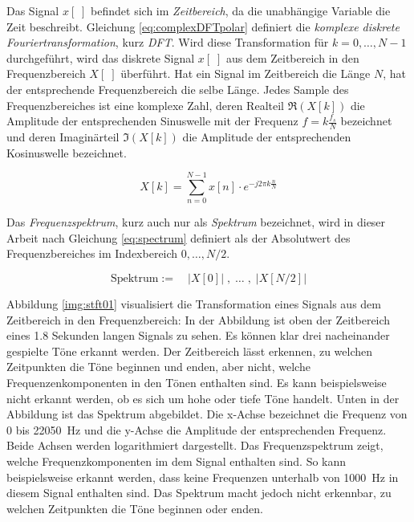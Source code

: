 Das Signal $x[\;]$ befindet sich im \emph{Zeitbereich}, da die unabhängige Variable die Zeit beschreibt. Gleichung \ref{eq:complexDFTpolar} definiert die \emph{komplexe diskrete Fouriertransformation}, kurz \emph{DFT}. Wird diese Transformation für $k = 0 , \ldots , N-1$ durchgeführt, wird das diskrete Signal $x[\;]$ aus dem Zeitbereich in den Frequenzbereich $X[\;]$ überführt. Hat ein Signal im Zeitbereich die Länge $N$, hat der entsprechende Frequenzbereich die selbe Länge. Jedes Sample des Frequenzbereiches ist eine komplexe Zahl, deren Realteil $\Re(X[k])$ die Amplitude der entsprechenden Sinuswelle mit der Frequenz $f = k\frac{f_s}{N}$ bezeichnet und deren Imaginärteil  $\Im(X[k])$ die Amplitude der entsprechenden Kosinuswelle bezeichnet.\cite[S. 149, S. 567 - 571]{dspGuide} \cite[S. 60]{sprachverarbeitung}

\begin{equation}
\label{eq:complexDFTpolar}
X[k] =  \sum_{n = 0}^{N-1}  x[n] \cdot e^{-j 2\pi k \frac{n}{N}}
\end{equation}

Das \emph{Frequenzspektrum}, kurz auch nur als \emph{Spektrum} bezeichnet, wird in dieser Arbeit nach Gleichung \ref{eq:spectrum} definiert als der Absolutwert des Frequenzbereiches im Indexbereich $0, \ldots , N/2$.

\begin{equation}
\label{eq:spectrum}
\text{Spektrum} := \quad |X[0]| \; , \; \ldots \; , \; |X[N/2]|
\end{equation}

Abbildung \ref{img:stft01} visualisiert die Transformation eines Signals aus dem Zeitbereich in den Frequenzbereich: In der Abbildung ist oben der Zeitbereich eines 1.8 Sekunden langen Signals zu sehen. Es können klar drei nacheinander gespielte Töne erkannt werden. Der Zeitbereich lässt erkennen, zu welchen Zeitpunkten die Töne beginnen und enden, aber nicht, welche Frequenzenkomponenten in den Tönen enthalten sind. Es kann beispielsweise nicht erkannt werden, ob es sich um hohe oder tiefe Töne handelt. Unten in der Abbildung ist das Spektrum abgebildet. Die x-Achse bezeichnet die Frequenz von 0 bis \SI{22050}{\hertz} und die y-Achse die Amplitude der entsprechenden Frequenz. Beide Achsen werden logarithmiert dargestellt. Das Frequenzspektrum zeigt, welche Frequenzkomponenten im dem Signal enthalten sind. So kann beispielsweise erkannt werden, dass keine Frequenzen unterhalb von \SI{1000}{\hertz} in diesem Signal enthalten sind. Das Spektrum macht jedoch nicht erkennbar, zu welchen Zeitpunkten die Töne beginnen oder enden. 

